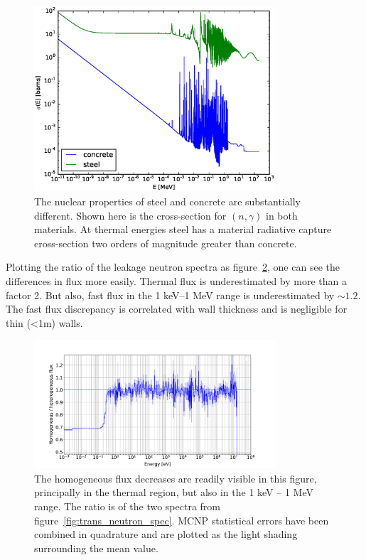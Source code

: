 \begin{figure}[H]
  \centering
  \includegraphics[width=0.8\textwidth]{n_rad_capture}
  \caption[Radiative capture cross-sections in concrete and steel.]{The nuclear properties of steel and concrete are substantially different. Shown here is the cross-section for $(n,\gamma)$ in both materials. At thermal energies steel has a material radiative capture cross-section two orders of magnitude greater than concrete.}
  \label{fig:n_rad_capture}
\end{figure}

Plotting the ratio of the leakage neutron spectra as figure~\ref{fig:relative_neutron_spectra}, one can see the differences in flux more easily. Thermal flux is underestimated by more than a factor 2. But also, fast flux in the 1 keV--1 MeV range is underestimated by $\sim1.2$. The fast flux discrepancy is correlated with wall thickness and is negligible for thin (\textless 1m) walls.

\begin{figure}[H]
  \centering
  \includegraphics[width=0.8\textwidth]{25HB200_800_relative_n_spectra}
  \caption[Ratio of transmitted spectra.]{The homogeneous flux decreases are readily visible in this figure, principally in the thermal region, but also in the 1 keV -- 1 MeV range. The ratio is of the two spectra from figure~\ref{fig:trans_neutron_spec}. MCNP statistical errors have been combined in quadrature and are plotted as the light shading surrounding the mean value.}
  \label{fig:relative_neutron_spectra}
\end{figure}

